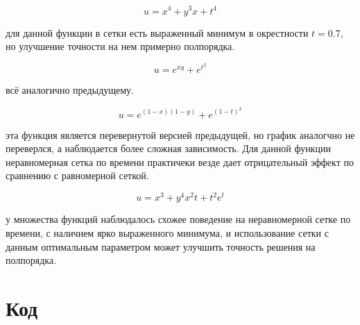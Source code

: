 $$ u = x^4 + y^3x + t^4 $$


\conclusion для данной функции в сетки есть выраженный минимум в окрестности $t=0.7$, но улучшение точности на нем примерно полпорядка.

$$ u = e^{xy} + e^{t^2} $$


\conclusion всё аналогично предыдущему.

$$ u = e^{(1-x)(1-y)} + e^{(1-t)^2} $$


\conclusion эта функция является перевернутой версией предыдущей, но график аналогчно не переверлся, а наблюдается более сложная зависимость. Для данной функции неравномерная сетка по времени практичеки везде дает отрицательный эффект по сравнению с равномерной сеткой.

$$ u = x^3 + y^4 x^2 t + t^2 e^t $$



\conclusion у множества функций наблюдалось схожее поведение на неравномерной сетке по времени, с наличием ярко выраженного минимума, и использование сетки с данным оптимальным параметром может улучшить точность решения на полпорядка.

\section{Код}

